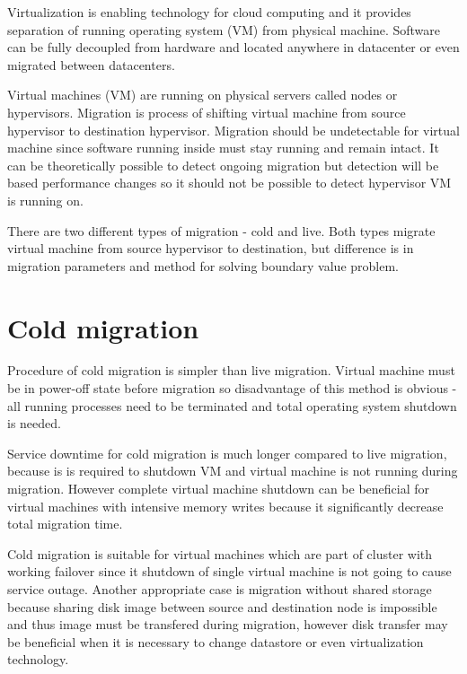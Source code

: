 


Virtualization is enabling technology for cloud computing and it provides separation of running operating system (\Ac{VM}) from physical machine. Software can be fully decoupled from hardware and located anywhere in datacenter or even migrated between datacenters. 

Virtual machines (\Ac{VM}) are running on physical servers called nodes or hypervisors. Migration is process of shifting virtual machine from source hypervisor to destination hypervisor. Migration should be undetectable for virtual machine since software running inside must stay running and remain intact. It can be theoretically possible to detect ongoing migration but detection will be based performance changes so it should not be possible to detect hypervisor \Ac{VM} is running on.


There are two different types of migration - cold and live. Both types migrate virtual machine from source hypervisor to destination, but difference is in migration parameters and method for solving boundary value problem.

\section{Cold migration}
Procedure of cold migration is simpler than live migration. Virtual machine must be in power-off state before migration so disadvantage of this method is obvious - all running processes need to be terminated and total operating system shutdown is needed.

Service downtime for cold migration is much longer compared to live migration, because is is required to shutdown \Ac{VM} and virtual machine is not running during migration. However complete virtual machine shutdown can be beneficial for virtual machines with intensive memory writes because it significantly decrease total migration time. 

Cold migration is suitable for virtual machines which are part of cluster with working failover since it shutdown of single virtual machine is not going to cause service outage. Another appropriate case is migration without shared storage because sharing disk image between source and destination node is impossible and thus image must be transfered during migration, however disk transfer may be beneficial when it is necessary to change datastore or even virtualization technology.
